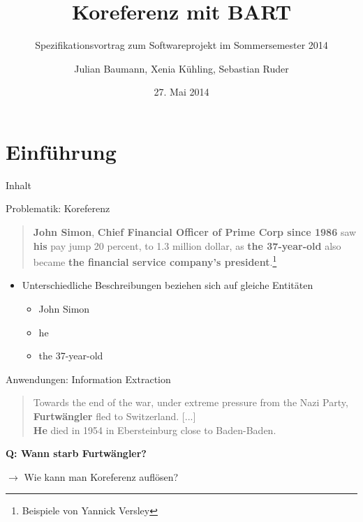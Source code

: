 \documentclass[11pt,a4paper]{beamer}
\author{Julian Baumann, Xenia Kühling, Sebastian Ruder}
\title{Koreferenz mit BART}
\subtitle{Spezifikationsvortrag zum Softwareprojekt im Sommersemester 2014}
\date{27. Mai 2014}
\begin{document}
\maketitle

\section{Einführung}
\begin{frame}{Inhalt}
\tableofcontents
\end{frame}

\begin{frame}{Problematik: Koreferenz}
\begin{quote}

\textbf{John Simon}, \textbf{Chief Financial Officer of Prime Corp since 1986} saw \textbf{his} pay jump 20 percent, to 1.3 million dollar, as \textbf{the 37-year-old} also became \textbf{the financial service company’s president}.\footnote{Beispiele von Yannick Versley}
\end{quote}
\bigskip
\begin{itemize}
\item Unterschiedliche Beschreibungen beziehen sich auf gleiche Entitäten
\begin{itemize}
\item John Simon
\item he
\item the 37-year-old
\end{itemize}
\end{itemize}
\end{frame} 

\begin{frame}{Anwendungen: Information Extraction}
\begin{quote}


Towards the end of the war, under extreme pressure from the Nazi
Party, \textbf{Furtwängler} fled to Switzerland. [...]\\
\textbf{He} died in 1954 in Ebersteinburg close to Baden-Baden.
\end{quote}
\bigskip

\textbf{Q: Wann starb Furtwängler?}
\bigskip

$\rightarrow$ Wie kann man Koreferenz auflösen?




\end{frame}
\end{document}
